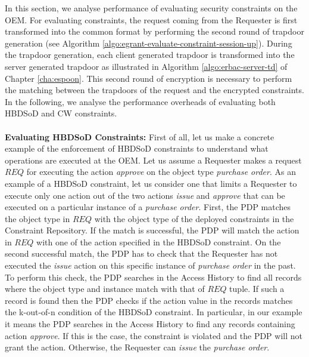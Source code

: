 \documentclass[epsfig,a4paper,11pt,titlepage]{book}
\numberwithin{algorithm}{chapter}
\begin{document}
In this section, we analyse performance of evaluating security constraints on the \gls{OEM}. For evaluating constraints, the request coming from the Requester is first transformed into the common format by performing the second round of trapdoor generation (see Algorithm \ref{algo:egrant-evaluate-constraint-session-up}). During the trapdoor generation, each client generated trapdoor is transformed into the server generated trapdoor as illustrated in Algorithm \ref{algo:erbac-server-td} of Chapter \ref{cha:espoon}. This second round of encryption is necessary to perform the matching between the trapdoors of the request and the encrypted constraints. In the following, we analyse the performance overheads of evaluating both \gls{HBDSoD} and \gls{CW} constraints. \\ \\
\noindent \textbf{Evaluating \gls{HBDSoD} Constraints:} First of all, let us make a concrete example of the enforcement of \gls{HBDSoD} constraints to understand what operations are executed at the \gls{OEM}. Let us assume a Requester makes a request $\mathit{REQ}$ for executing the action \emph{approve} on the object type \emph{purchase order}. As an example of a \gls{HBDSoD} constraint, let us consider one that limits a Requester to execute only one action out of the two actions \emph{issue} and \emph{approve} that can be executed on a particular instance of a \emph{purchase order}. First, the \gls{PDP} matches the object type in $\mathit{REQ}$ with the object type of the deployed constraints in the Constraint Repository. If the match is successful, the \gls{PDP} will match the action in $\mathit{REQ}$ with one of the action specified in the \gls{HBDSoD} constraint. On the second successful match, the \gls{PDP} has to check that the Requester has not executed the \emph{issue} action on this specific instance of \emph{purchase order} in the past. To perform this check, the \gls{PDP} searches in the Access History to find all records where the object type and instance match with that of $\mathit{REQ}$ tuple. If such a record is found then the \gls{PDP} checks if the action value in the records matches the k-out-of-n condition of the \gls{HBDSoD} constraint. In particular, in our example it means the \gls{PDP} searches in the Access History to find any records containing action \emph{approve}. If this is the case, the constraint is violated and the \gls{PDP} will not grant the action. Otherwise, the Requester can \emph{issue} the \emph{purchase order}.
\end{document}
